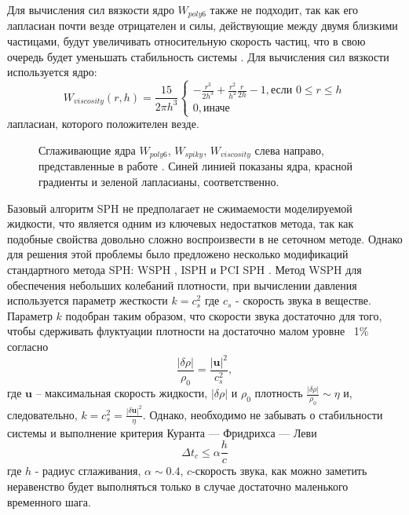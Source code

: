 Для вычисления сил вязкости ядро \(W_{poly6}\) также не подходит, так как его лапласиан почти везде отрицателен и силы, действующие между двумя близкими частицами, будут увеличивать относительную скорость частиц, что в свою очередь будет уменьшать стабильность системы \cite {Müller2003}.  Для вычисления сил вязкости используется ядро:
\[
  W_{viscosity}(r,h)= \frac{15}{2\pi h^{3}}
  \begin{cases}
    -\frac{r^{3}}{2h^{3}}+\frac{r^{2}}{h^{2}} \frac{r}{2h} - 1, \text{если } 0 \leqslant r \leqslant  h \\
    0, \text{иначе}
  \end{cases}
\]
лапласиан, которого положителен везде.

\begin{figure}[ht]
  \caption{Сглаживающие ядра \(W_{poly6}\), \(W_{spiky}\), \(W_{viscosity}\) слева направо, представленные в работе \cite {Müller2003}. Синей линией показаны ядра, красной градиенты и зеленой лапласианы, соответственно.}\label{fig:ker_kind}
\end{figure}

Базовый алгоритм SPH не предполагает не сжимаемости моделируемой жидкости, что является одним из ключевых недостатков метода, так как подобные свойства довольно сложно воспроизвести в не сеточном методе. Однако для решения этой проблемы было предложено несколько модификаций стандартного метода SPH: WSPH \cite {Becker2007}, ISPH \cite {Shao2003, CUMMINS1999584} и PCI SPH \cite {Solenthaler2009}. Метод WSPH для обеспечения небольших колебаний плотности, при вычислении давления используется параметр жесткости \(k=c_{s}^2\) где \(c_{s}\) - скорость звука в веществе. Параметр \(k\) подобран таким образом, что скорости звука достаточно для того, чтобы сдерживать флуктуации плотности на достаточно малом уровне ~1\%  \cite {Solenthaler2009} согласно \cite {Monaghan2005}
\[
  \frac{\left | \delta \rho \right |}{\rho_{0}}=\frac{\left | \boldsymbol{u} \right |^2}{c_{s}^2},
\]
где \(\boldsymbol{u}\) – максимальная скорость жидкости, \(\left | \delta \rho \right |\) и \(\rho_{0}\) плотность \(\frac{\left | \delta \rho \right |}{\rho_{0}} \sim \eta \) и, следовательно, \(k=c_{s}^{2}=\frac{\left | \delta \boldsymbol{u} \right |^{2}}{\eta}\). Однако, необходимо не  забывать о стабильности системы и выполнение критерия Куранта — Фридрихса — Леви \cite {Courant1967}
\[
  \Delta t_{c} \leq \alpha \frac{h}{c}
\]
где \(h\) - радиус сглаживания, \(\alpha \sim 0.4\), \( c \)-скорость звука, как можно заметить неравенство будет выполняться только в случае достаточно маленького временного шага.

